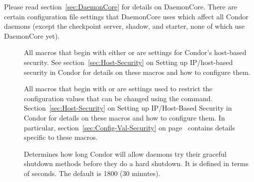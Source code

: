 Please read section~\ref{sec:DaemonCore} for details
on DaemonCore.  There are certain configuration file settings that
DaemonCore uses which affect all Condor daemons (except the checkpoint
server, shadow, and starter, none of which use DaemonCore yet).
\begin{description}
  
\item[] \label{param:HostAllow} All
  macros that begin with either  or
   are settings for Condor's host-based security.
  See section~\ref{sec:Host-Security} on Setting up
  IP/host-based security in Condor for details on these
  macros and how to configure them.

\item[] \label{param:SettableAttrs} All
  macros that begin with  or
   are settings used to restrict the 
  configuration values that can be changed using the  
  command.
  Section~\ref{sec:Host-Security} on Setting up
  IP/Host-Based Security in Condor for details on these
  macros and how to configure them.  
  In particular, section~\ref{sec:Config-Val-Security}
  on page~\pageref{sec:Config-Val-Security} contains details specific to
  these macros.

\item[]
  \label{param:ShutdownGracefulTimeout} Determines how long
  Condor will allow daemons try their graceful shutdown methods
  before they do a hard shutdown.  It is defined in terms of seconds.
  The default is 1800 (30 minutes).


\end{description}
